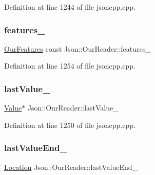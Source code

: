 Definition at line 1244 of file jsoncpp.\+cpp.

\hypertarget{class_json_1_1_our_reader_a2714302d5cc54ca2ce4118ea51c0397a}{}\label{class_json_1_1_our_reader_a2714302d5cc54ca2ce4118ea51c0397a} 
\subsubsection{\texorpdfstring{features\+\_\+}{features\_}}
{\footnotesize\ttfamily \hyperlink{class_json_1_1_our_features}{Our\+Features} const Json\+::\+Our\+Reader\+::features\+\_\+\hspace{0.3cm}{\ttfamily [private]}}



Definition at line 1254 of file jsoncpp.\+cpp.

\hypertarget{class_json_1_1_our_reader_a9f994b6a2227c5d96e6ed6cbc74ed251}{}\label{class_json_1_1_our_reader_a9f994b6a2227c5d96e6ed6cbc74ed251} 
\subsubsection{\texorpdfstring{last\+Value\+\_\+}{lastValue\_}}
{\footnotesize\ttfamily \hyperlink{class_json_1_1_value}{Value}$\ast$ Json\+::\+Our\+Reader\+::last\+Value\+\_\+\hspace{0.3cm}{\ttfamily [private]}}



Definition at line 1250 of file jsoncpp.\+cpp.

\hypertarget{class_json_1_1_our_reader_a101eadc45e01c60628b53f0db3d13482}{}\label{class_json_1_1_our_reader_a101eadc45e01c60628b53f0db3d13482} 
\subsubsection{\texorpdfstring{last\+Value\+End\+\_\+}{lastValueEnd\_}}
{\footnotesize\ttfamily \hyperlink{class_json_1_1_our_reader_a1bdc7bbc52ba87cae6b19746f2ee0189}{Location} Json\+::\+Our\+Reader\+::last\+Value\+End\+\_\+\hspace{0.3cm}{\ttfamily [private]}}



